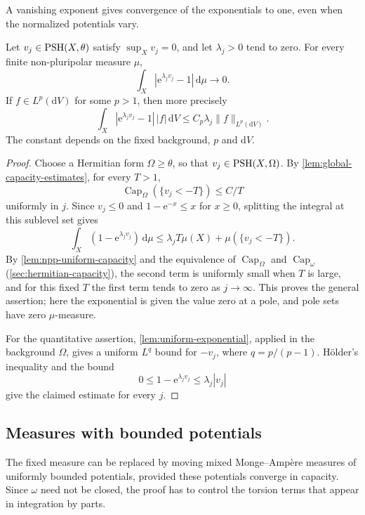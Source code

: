 A vanishing exponent gives convergence of the exponentials to one, even when the normalized potentials vary.

\begin{lemma}\label{lem:normalized-exponential-lp}\label{lem:normalized-exponential-npp}
Let $v_j\in\mathrm{PSH}(X,\theta)$ satisfy $\sup_Xv_j=0$, and let $\lambda_j>0$ tend to zero. For every finite non-pluripolar measure $\mu$,
\[
 \int_X\left|\mathrm{e}^{\lambda_jv_j}-1\right|\,\mathrm{d}\mu\longrightarrow0.
\]
If $f\in L^p(\mathrm{d}V)$ for some $p>1$, then more precisely
\[
 \int_X\left|\mathrm{e}^{\lambda_jv_j}-1\right|\,|f|\,\mathrm{d}V
 \leq C_p\lambda_j\|f\|_{L^p(\mathrm{d}V)}.
\]
The constant depends on the fixed background, $p$ and $\mathrm{d}V$.
\end{lemma}
\begin{proof}
Choose a Hermitian form $\Omega\geq\theta$, so that $v_j\in\mathrm{PSH}(X,\Omega)$. By \cref{lem:global-capacity-estimates}, for every $T>1$,
\[
 \operatorname{Cap}_\Omega(\{v_j<-T\})\leq C/T
\]
uniformly in $j$. Since $v_j\leq0$ and $1-\mathrm{e}^{-x}\leq x$ for $x\geq0$, splitting the integral at this sublevel set gives
\[
 \int_X(1-\mathrm{e}^{\lambda_jv_j})\,\mathrm{d}\mu
 \leq\lambda_jT\mu(X)+\mu(\{v_j<-T\}).
\]
By \cref{lem:npp-uniform-capacity} and the equivalence of $\operatorname{Cap}_\Omega$ and $\operatorname{Cap}_\omega$ (\cref{sec:hermitian-capacity}), the second term is uniformly small when $T$ is large, and for this fixed $T$ the first term tends to zero as $j\to\infty$. This proves the general assertion; here the exponential is given the value zero at a pole, and pole sets have zero $\mu$-measure.

For the quantitative assertion, \cref{lem:uniform-exponential}, applied in the background $\Omega$, gives a uniform $L^q$ bound for $-v_j$, where $q=p/(p-1)$. H\"older's inequality and the bound
\[
 0\leq1-\mathrm{e}^{\lambda_jv_j}\leq\lambda_j|v_j|
\]
give the claimed estimate for every $j$.
\end{proof}

\subsection{Measures with bounded potentials}

The fixed measure can be replaced by moving mixed Monge--Amp\`ere measures of uniformly bounded potentials, provided these potentials converge in capacity. Since $\omega$ need not be closed, the proof has to control the torsion terms that appear in integration by parts.

